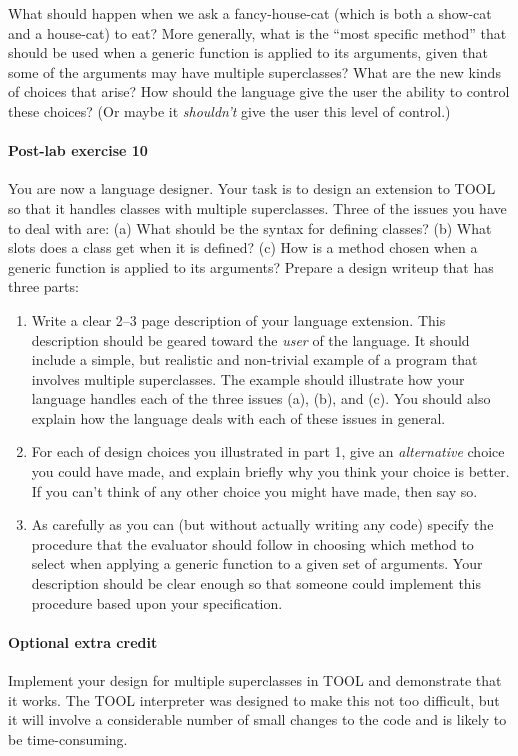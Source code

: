 \noindent What should happen when we ask a fancy-house-cat (which is
both a show-cat and a house-cat) to eat?  More generally, what is the
``most specific method'' that should be used when a generic function
is applied to its arguments, given that some of the arguments may have
multiple superclasses?  What are the new kinds of choices that arise?
How should the language give the user the ability to control these
choices?  (Or maybe it {\it shouldn't} give the user this level of
control.)

\paragraph{Post-lab exercise 10} You are now a language designer.
Your task is to design an extension to TOOL so that it handles
classes with multiple superclasses.  Three of the issues you have to
deal with are: (a) What should be the syntax for defining classes?
(b) What slots does a class get when it is defined?  (c) How is a
method chosen when a generic function is applied to its arguments?
Prepare a design writeup that has three parts:

\begin{enumerate}

\item Write a clear 2--3 page description of your language extension.
This description should be geared toward the {\it user} of the
language.  It should include a simple, but realistic and non-trivial
example of a program that involves multiple superclasses.  The
example should illustrate how your language handles each of the
three issues (a), (b), and (c).  You should also explain how the
language deals with each of these issues in general.

\item For each of design choices you illustrated in part 1, give an
{\it alternative} choice you could have made, and explain briefly why
you think your choice is better.  If you can't think of any other
choice you might have made, then say so.

\item As carefully as you can (but without actually writing any code)
specify the procedure that the evaluator should follow in choosing
which method to select when applying a generic function to a given
set of arguments.  Your description should be clear enough so that
someone could implement this procedure based upon your specification.

\end{enumerate}

\paragraph{Optional extra credit}  Implement your design for multiple
superclasses in TOOL and demonstrate that it works.  The TOOL
interpreter was designed to make this not too difficult, but it will
involve a considerable number of small changes to the code and is
likely to be time-consuming.







